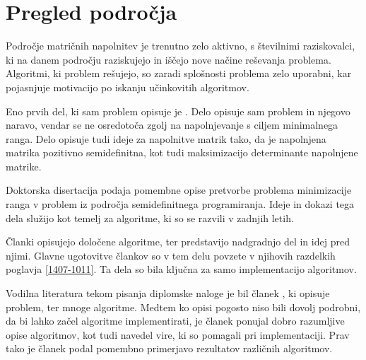 \chapter{Pregled področja} \label{1407-1010}
Področje matričnih napolnitev je trenutno zelo aktivno, s številnimi raziskovalci, ki na danem področju raziskujejo in iščejo nove načine reševanja problema. Algoritmi, ki problem rešujejo, so zaradi splošnosti problema zelo uporabni, kar pojasnjuje motivacijo po iskanju učinkovitih algoritmov.

Eno prvih del, ki sam problem opisuje je \cite{MCPAS}. Delo opisuje sam problem in njegovo naravo, vendar se ne osredotoča zgolj na napolnjevanje s ciljem minimalnega ranga. Delo opisuje tudi ideje za napolnitve matrik tako, da je napolnjena matrika pozitivno semidefinitna, kot tudi maksimizacijo determinante napolnjene matrike.

Doktorska disertacija \cite{NNM-PHD} podaja pomembne opise pretvorbe problema minimizacije ranga v problem iz področja semidefinitnega programiranja. Ideje in dokazi tega dela služijo kot temelj za algoritme, ki so se razvili v zadnjih letih. 

Članki \cite{CCS,TNNM-HZYLH12,AST-TK15,LMaFit-WY12} opisujejo določene algoritme, ter predstavijo nadgradnjo del in idej pred njimi. Glavne ugotovitve člankov so v tem delu povzete v njihovih razdelkih poglavja \ref{1407-1011}. Ta dela so bila ključna za samo implementacijo algoritmov.

Vodilna literatura tekom pisanja diplomske naloge je bil članek \cite{Survey-NKS19}, ki opisuje problem, ter mnoge algoritme. Medtem ko opisi pogosto niso bili dovolj podrobni, da bi lahko začel algoritme implementirati, je članek ponujal dobro razumljive opise algoritmov, kot tudi navedel vire, ki so pomagali pri implementaciji. Prav tako je članek podal pomembno primerjavo rezultatov različnih algoritmov.